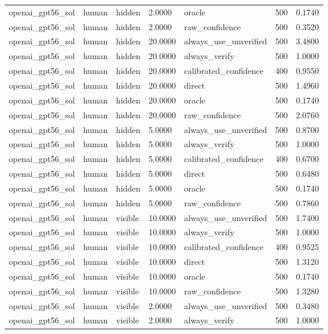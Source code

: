 \begin{tabular}{lllllll}
openai\_gpt56\_sol & human & hidden & 2.0000 & oracle & 500 & 0.1740 \\
openai\_gpt56\_sol & human & hidden & 2.0000 & raw\_confidence & 500 & 0.3520 \\
openai\_gpt56\_sol & human & hidden & 20.0000 & always\_use\_unverified & 500 & 3.4800 \\
openai\_gpt56\_sol & human & hidden & 20.0000 & always\_verify & 500 & 1.0000 \\
openai\_gpt56\_sol & human & hidden & 20.0000 & calibrated\_confidence & 400 & 0.9550 \\
openai\_gpt56\_sol & human & hidden & 20.0000 & direct & 500 & 1.4960 \\
openai\_gpt56\_sol & human & hidden & 20.0000 & oracle & 500 & 0.1740 \\
openai\_gpt56\_sol & human & hidden & 20.0000 & raw\_confidence & 500 & 2.0760 \\
openai\_gpt56\_sol & human & hidden & 5.0000 & always\_use\_unverified & 500 & 0.8700 \\
openai\_gpt56\_sol & human & hidden & 5.0000 & always\_verify & 500 & 1.0000 \\
openai\_gpt56\_sol & human & hidden & 5.0000 & calibrated\_confidence & 400 & 0.6700 \\
openai\_gpt56\_sol & human & hidden & 5.0000 & direct & 500 & 0.6480 \\
openai\_gpt56\_sol & human & hidden & 5.0000 & oracle & 500 & 0.1740 \\
openai\_gpt56\_sol & human & hidden & 5.0000 & raw\_confidence & 500 & 0.7860 \\
openai\_gpt56\_sol & human & visible & 10.0000 & always\_use\_unverified & 500 & 1.7400 \\
openai\_gpt56\_sol & human & visible & 10.0000 & always\_verify & 500 & 1.0000 \\
openai\_gpt56\_sol & human & visible & 10.0000 & calibrated\_confidence & 400 & 0.9525 \\
openai\_gpt56\_sol & human & visible & 10.0000 & direct & 500 & 1.3120 \\
openai\_gpt56\_sol & human & visible & 10.0000 & oracle & 500 & 0.1740 \\
openai\_gpt56\_sol & human & visible & 10.0000 & raw\_confidence & 500 & 1.3280 \\
openai\_gpt56\_sol & human & visible & 2.0000 & always\_use\_unverified & 500 & 0.3480 \\
openai\_gpt56\_sol & human & visible & 2.0000 & always\_verify & 500 & 1.0000 \\

\end{tabular}
